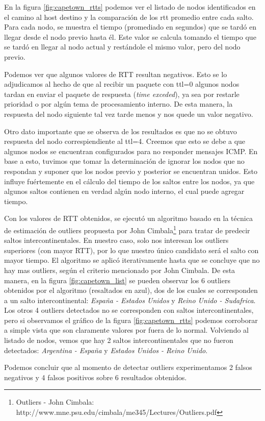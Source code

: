 \par En la figura \ref{fig:capetown_rtts} podemos ver el listado de nodos identificados en el camino al host destino y la comparación de los rtt promedio entre cada salto. Para cada nodo, se muestra el tiempo (promediado en segundos) que se tardó en llegar desde el nodo previo hasta él. Este valor se calcula tomando el tiempo que se tardó en llegar al nodo actual y restándole el mismo valor, pero del nodo previo.
\par Podemos ver que algunos valores de RTT resultan negativos. Esto se lo adjudicamos al hecho de que al recibir un paquete con ttl=0 algunos nodos tardan en enviar el paquete de respuesta (\textit{time exceded}), ya sea por restarle prioridad o por algún tema de procesamiento interno. De esta manera, la respuesta del nodo siguiente tal vez tarde menos y nos quede un valor negativo.
\par Otro dato importante que se observa de los resultados es que no se obtuvo respuesta del nodo correspiendiente al ttl=4. Creemos que esto se debe a que algunos nodos se encuentran configurados para no responder mensajes ICMP. En base a esto, tuvimos que tomar la determinación de ignorar los nodos que no respondan y suponer que los nodos previo y posterior se encuentran unidos. Esto influye fuértemente en el cálculo del tiempo de los saltos entre los nodos, ya que algunos saltos contienen en verdad algún nodo interno, el cual puede agregar tiempo.
\par Con los valores de RTT obtenidos, se ejecutó un algoritmo basado en la técnica de estimación de outliers propuesta por John Cimbala\footnote{Outliers - John Cimbala: http://www.mne.psu.edu/cimbala/me345/Lectures/Outliers.pdf} para tratar de predecir saltos intercontinentales. En nuestro caso, solo nos interesan los outliers superiores (con mayor RTT), por lo que nuestro único candidato será el salto con mayor tiempo. El algoritmo se aplicó iterativamente hasta que se concluye que no hay mas outliers, según el criterio mencionado por John Cimbala. De esta manera, en la figura \ref{fig:capetown_list} se pueden observar los 6 outliers obtenidos por el algoritmo (resaltados en azul), dos de los cuales se corresponden a un salto intercontinental: \textit{España - Estados Unidos} y \textit{Reino Unido - Sudafrica}. Los otros 4 outliers detectados no se corresponden con saltos intercontinentales, pero si observamos el gráfico de la figura \ref{fig:capetown_rtts} podemos corroborar a simple vista que son claramente valores por fuera de lo normal. Volviendo al listado de nodos, vemos que hay 2 saltos intercontinentales que no fueron detectados: \textit{Argentina - España} y \textit{Estados Unidos - Reino Unido}.
\par Podemos concluir que al momento de detectar outliers experimentamos 2 falsos negativos y 4 falsos positivos sobre 6 resultados obtenidos.
